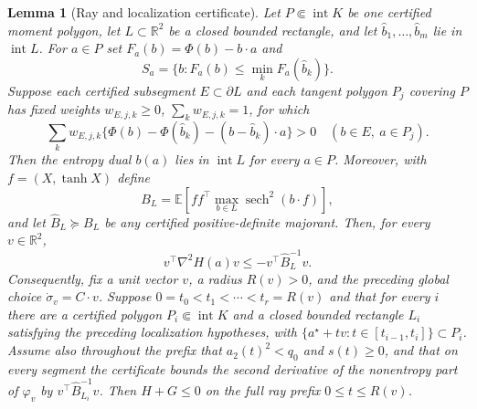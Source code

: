 \documentclass[11pt]{article}
\newtheorem{lemma}[theorem]{Lemma}
\newcommand{\R}{\mathbb{R}}
\newcommand{\E}{\mathbb{E}}
\begin{document}
\begin{lemma}[Ray and localization certificate]\label{lem:ray-localization}
Let $P\Subset\operatorname{int}K$ be one certified moment polygon, let
$L\subset\R^2$ be a closed bounded rectangle, and let
$\widehat b_1,\ldots,\widehat b_m$
lie in $\operatorname{int}L$.  For $a\in P$ set
$F_a(b)=\Phi(b)-b\cdot a$ and
\[
 S_a=\{b:F_a(b)\le\min_kF_a(\widehat b_k)\}.
\]
Suppose each certified subsegment $E\subset\partial L$ and each tangent
polygon $P_j$ covering $P$ has fixed weights
$w_{E,j,k}\ge0$, $\sum_kw_{E,j,k}=1$, for
which
\begin{equation}\label{eq:anchor-boundary}
 \sum_k w_{E,j,k}\{\Phi(b)-\Phi(\widehat b_k)
              -(b-\widehat b_k)\cdot a\}>0
 \quad (b\in E,\ a\in P_j).
\end{equation}
Then the entropy dual $b(a)$ lies in $\operatorname{int}L$ for every
$a\in P$.  Moreover, with $f=(X,\tanh X)$ define
\[
 B_L=\E\left[ff^\top\max_{b\in L}\operatorname{sech}^2(b\cdot f)\right],
\]
and let $\widehat B_L\succeq B_L$ be any certified positive-definite
majorant. Then, for every $v\in\R^2$,
\begin{equation}\label{eq:entropy-ray-bound}
 v^\top\nabla^2H(a)v\le-v^\top \widehat B_L^{-1}v.
\end{equation}
Consequently, fix a unit vector $v$, a radius $R(v)>0$, and the preceding
global choice $\dot\sigma_v=C\cdot v$.  Suppose
$0=t_0<t_1<\cdots<t_r=R(v)$ and that for every $i$ there are a certified
polygon $P_i\Subset\operatorname{int}K$ and a closed bounded rectangle
$L_i$ satisfying the preceding localization hypotheses, with
$\{a^\star+tv:t\in[t_{i-1},t_i]\}\subset P_i$.  Assume also throughout the
prefix that $a_2(t)^2<q_0$ and $s(t)\ge0$, and that on every segment the
certificate bounds the second derivative of the nonentropy part of
$\varphi_v$ by $v^\top \widehat B_{L_i}^{-1}v$.  Then $H+G\le0$ on the full ray prefix
$0\le t\le R(v)$.
\end{lemma}
\end{document}
